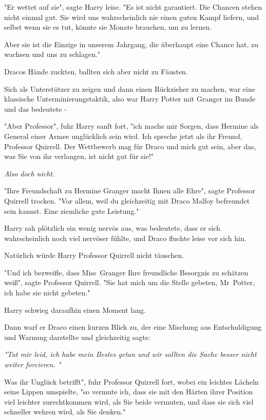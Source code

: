 {"Er wettet auf sie", sagte Harry leise. "Es ist nicht garantiert. Die Chancen stehen nicht einmal gut. Sie wird uns wahrscheinlich nie einen guten Kampf liefern, und selbst wenn sie es tut, könnte sie Monate brauchen, um zu lernen.

Aber sie ist die Einzige in unserem Jahrgang, die überhaupt eine Chance hat, zu wachsen und uns zu schlagen."

Dracos Hände zuckten, ballten sich aber nicht zu Fäusten.

Sich als Unterstützer zu zeigen und dann einen Rückzieher zu machen, war eine klassische Unterminierungstaktik, also war Harry Potter mit Granger im Bunde und das bedeutete -

"Aber Professor", fuhr Harry sanft fort, "ich mache mir Sorgen, dass Hermine als General einer Armee unglücklich sein wird. Ich spreche jetzt als ihr Freund, Professor Quirrell. Der Wettbewerb mag für Draco und mich gut sein, aber das, was Sie von ihr verlangen, ist nicht gut für sie!"

\emph{Also doch nicht.}

"Ihre Freundschaft zu Hermine Granger macht Ihnen alle Ehre", sagte Professor Quirrell trocken. "Vor allem, weil du gleichzeitig mit Draco Malfoy befreundet sein kannst. Eine ziemliche gute Leistung."

Harry sah plötzlich ein wenig nervös aus, was bedeutete, dass er sich wahrscheinlich noch viel nervöser fühlte, und Draco fluchte leise vor sich hin.

Natürlich würde Harry Professor Quirrell nicht täuschen.

"Und ich bezweifle, dass Miss~Granger Ihre freundliche Besorgnis zu schätzen weiß", sagte Professor Quirrell. "Sie hat mich um die Stelle gebeten, Mr~Potter, ich habe sie nicht gebeten."

Harry schwieg daraufhin einen Moment lang.

Dann warf er Draco einen kurzen Blick zu, der eine Mischung aus Entschuldigung und Warnung darstellte und gleichzeitig sagte:

\emph{"Tut mir leid, ich habe mein Bestes getan und wir sollten die Sache besser nicht weiter forcieren. "}

Was ihr Unglück betrifft", fuhr Professor Quirrell fort, wobei ein leichtes Lächeln seine Lippen umspielte, "so vermute ich, dass sie mit den Härten ihrer Position viel leichter zurechtkommen wird, als Sie beide vermuten, und dass sie sich viel schneller wehren wird, als Sie denken."

}
